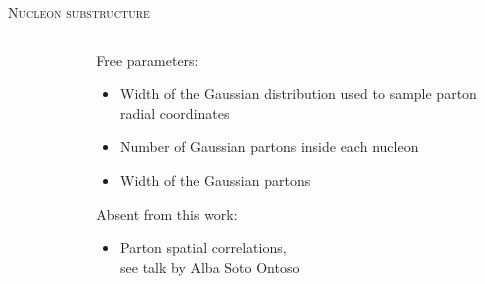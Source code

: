 \documentclass[aspectratio=169]{beamer}
\begin{document}
\begin{frame}[t, plain]{\scshape Nucleon substructure}
\begin{columns}[t]
\begin{column}{.2\textwidth}
\begin{figure}
      \end{figure}
    \end{column}
    \begin{column}{.4\textwidth}
      \centering
      \textcolor{theme}{Free parameters:}\\[1ex]
      \begin{itemize}
        \small
        \item Width of the Gaussian distribution used to sample
          parton radial coordinates
        \item Number of Gaussian partons inside each nucleon
        \item Width of the Gaussian partons
      \end{itemize}
      \bigskip
      \textcolor{theme}{Absent from this work:}\\[1ex]
      \begin{itemize}
        \small
        \item Parton spatial correlations,\\
          see talk by Alba Soto Ontoso
      \end{itemize}
    \end{column}
  \end{columns}
\end{frame}
\end{document}
